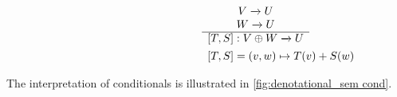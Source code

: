 \begin{figure} [H]
\begin{equation}
\begin{split}
\begin{aligned}
\hspace{95pt}&
\begin{minipage}[t]{0.3\textwidth}
$\begin{array}{c}
     V  \xrightarrow{} U  \\
      W \xrightarrow{} U  \\
    \hline
  [T,S]: V \oplus W \xrightarrow{} U
\end{array}
$
\end{minipage} \\
\hspace{95pt}&
\begin{minipage}[t]{0.3\textwidth}
$\begin{array}{c}
  [T,S] = (v,w) \mapsto T(v)+S(w) 
\end{array}
$
\end{minipage}
\end{aligned}
\end{split}
\end{equation}
\label{fig:either}
\end{figure}

The interpretation of conditionals is illustrated in \autoref{fig:denotational_sem cond}.

